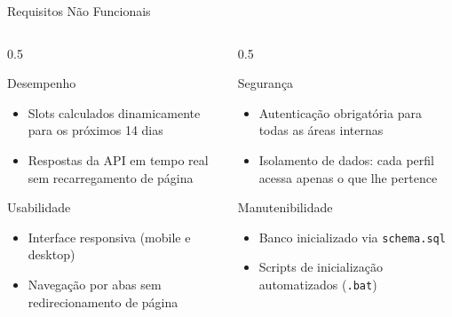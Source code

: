 \documentclass[xcolor={table}]{beamer}
\begin{document}
\begin{frame}{Requisitos Não Funcionais}
    \begin{columns}
        \begin{column}{0.5\textwidth}
            \begin{block}{Desempenho}
                \begin{itemize}
                    \item[\color{ClinicBlue}$\checkmark$] Slots calculados dinamicamente para os próximos 14 dias
                    \item[\color{ClinicBlue}$\checkmark$] Respostas da API em tempo real sem recarregamento de página
                \end{itemize}
            \end{block}
            \vspace{0.2cm}
            \begin{block}{Usabilidade}
                \begin{itemize}
                    \item[\color{ClinicBlue}$\checkmark$] Interface responsiva (mobile e desktop)
                    \item[\color{ClinicBlue}$\checkmark$] Navegação por abas sem redirecionamento de página
                \end{itemize}
            \end{block}
        \end{column}
        \begin{column}{0.5\textwidth}
            \begin{block}{Segurança}
                \begin{itemize}
                    \item[\color{ClinicBlue}$\checkmark$] Autenticação obrigatória para todas as áreas internas
                    \item[\color{ClinicBlue}$\checkmark$] Isolamento de dados: cada perfil acessa apenas o que lhe pertence
                \end{itemize}
            \end{block}
            \vspace{0.2cm}
            \begin{block}{Manutenibilidade}
                \begin{itemize}
                    \item[\color{ClinicBlue}$\checkmark$] Banco inicializado via \texttt{schema.sql}
                    \item[\color{ClinicBlue}$\checkmark$] Scripts de inicialização automatizados (\texttt{.bat})
                \end{itemize}
            \end{block}
        \end{column}
    \end{columns}
\end{frame}
\end{document}
